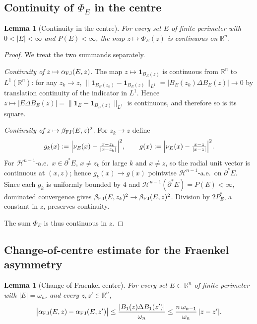 \documentclass[11pt]{article}
\newtheorem{lemma}[theorem]{Lemma}
\theoremstyle{definition}
\newcommand{\R}{\mathbb{R}}
\newcommand{\Hn}{\mathcal H^{n-1}}
\newcommand{\alphaFJ}{\alpha_{\rm FJ}}
\newcommand{\betaFJ}{\beta_{\rm FJ}}
\begin{document}
\subsection{Continuity of $\Phi_E$ in the centre}

\begin{lemma}[Continuity in the centre]\label{lem:Phi-cts}
For every set \(E\) of finite perimeter with \(0<|E|<\infty\) and
\(P(E)<\infty\), the map
\(z\mapsto\Phi_E(z)\) is continuous on \(\R^{n}\).
\end{lemma}

\begin{proof}
We treat the two summands separately.

\smallskip\emph{Continuity of} \(z\mapsto\alphaFJ(E,z)\).
The map \(z\mapsto\mathbf 1_{B_E(z)}\) is continuous from \(\R^{n}\)
to \(L^{1}(\R^{n})\): for any \(z_k\to z\),
\(\|\mathbf 1_{B_E(z_k)}-\mathbf 1_{B_E(z)}\|_{L^{1}}=|B_E(z_k)
\Delta B_E(z)|\to 0\) by translation continuity of the indicator in
\(L^{1}\).  Hence
\(z\mapsto|E\Delta B_E(z)|=\|\mathbf 1_E-\mathbf 1_{B_E(z)}\|_{L^{1}}\)
is continuous, and therefore so is its square.

\smallskip\emph{Continuity of} \(z\mapsto \betaFJ(E,z)^{2}\).
For \(z_k\to z\) define
\[
   g_k(x):=
      \Bigl|\nu_E(x)-\tfrac{x-z_k}{|x-z_k|}\Bigr|^{2},
   \qquad
   g(x):=
      \Bigl|\nu_E(x)-\tfrac{x-z}{|x-z|}\Bigr|^{2}.
\]
For \(\Hn\)-a.e.\ \(x\in\partial^{\ast}E\), \(x\ne z_k\) for large
\(k\) and \(x\ne z\), so the radial unit vector is continuous at
\((x,z)\); hence \(g_k(x)\to g(x)\) pointwise \(\Hn\)-a.e.\ on
\(\partial^{\ast}E\).  Since each \(g_k\) is uniformly bounded by
\(4\) and \(\Hn(\partial^{\ast}E)=P(E)<\infty\), dominated
convergence gives
\(\betaFJ(E,z_k)^{2}\to\betaFJ(E,z)^{2}\).  Division by
\(2P_E^{\ast}\), a constant in \(z\), preserves continuity.

The sum \(\Phi_E\) is thus continuous in \(z\).
\end{proof}

\subsection{Change-of-centre estimate for the Fraenkel asymmetry}

\begin{lemma}[Change of Fraenkel centre]\label{lem:change-centre}
For every set \(E\subset\R^{n}\) of finite perimeter with
\(|E|=\omega_n\), and every \(z,z'\in\R^{n}\),
\[
   \bigl|\alphaFJ(E,z)-\alphaFJ(E,z')\bigr|
   \le \frac{|B_1(z)\Delta B_1(z')|}{\omega_n}
   \le \frac{n\,\omega_{n-1}}{\omega_n}\,|z-z'|.
\]
\end{lemma}
\end{document}
